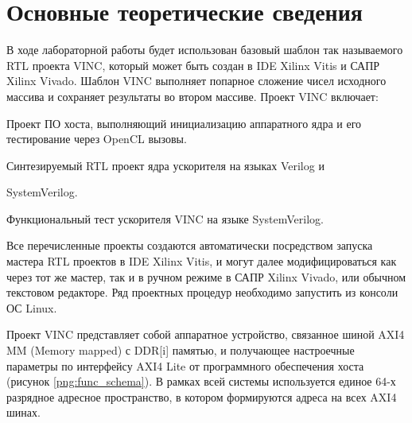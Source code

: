 \chapter*{Основные теоретические сведения}
В ходе лабораторной работы будет использован базовый шаблон так называемого RTL проекта VINC, который может быть создан в IDE Xilinx Vitis и САПР Xilinx Vivado. Шаблон VINC выполняет попарное сложение чисел исходного массива и сохраняет результаты во втором массиве. Проект VINC включает:

Проект ПО хоста, выполняющий инициализацию аппаратного ядра и его тестирование через OpenCL вызовы.

Синтезируемый RTL проект ядра ускорителя на языках Verilog и

SystemVerilog.

Функциональный тест ускорителя VINC на языке SystemVerilog.

Все перечисленные проекты создаются автоматически посредством запуска мастера RTL проектов в IDE Xilinx Vitis, и могут далее модифицироваться как через тот же мастер, так и в ручном режиме в САПР Xilinx Vivado, или обычном текстовом редакторе. Ряд проектных процедур необходимо запустить из консоли ОС Linux.

Проект VINC представляет собой аппаратное устройство, связанное шиной AXI4 MM (Memory mapped) с DDR[i] памятью, и получающее настроечные параметры по интерфейсу AXI4 Lite от программного обеспечения хоста (рисунок \ref{png:func_schema}). В рамках всей системы используется единое 64-х разрядное адресное пространство, в котором формируются адреса на всех AXI4 шинах.

\begin{figure}[H]
	\captionsetup{justification=centering}
\end{figure}

